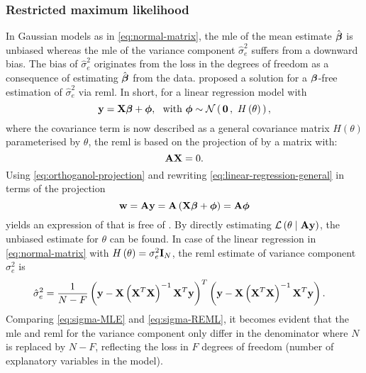 \subsubsection{Restricted maximum likelihood}
\label{subsubsection:REML}
In Gaussian models as in \cref{eq:normal-matrix}, the \gls{mle} of the mean estimate \(\hat{\boldsymbol{\mathbf{\beta}}}\) is unbiased whereas the \gls{mle} of the variance component \(\hat{\sigma}^2_e \) suffers from a downward bias. The bias of \(\hat{\sigma}^2_e \) originates from the loss in the degrees of freedom as a consequence of estimating \(\hat{\boldsymbol{\mathbf{\beta}}}\) from the data.  proposed a solution for a \(\boldsymbol{\mathbf{\beta}}\)-free estimation of \(\hat{\sigma}^2_e \) via \gls{reml}. In short, for a linear regression model with 
\begin{equation}
\boldsymbol{\mathbf{y}} = \boldsymbol{\mathbf{X}}\boldsymbol{\mathbf{\beta}} + \boldsymbol{\mathbf{\phi}}, \,\,\,\, \text{with }  \boldsymbol{\mathbf{\phi}} \sim  \mathcal{N}\left(\,{\boldsymbol{\mathbf{0}}}\,,~{H\left(\theta\right)}\,\right),
\label{eq:linear-regression-general}
\end{equation}
%
where the covariance term is now described as a general covariance matrix \(H\left(\theta\right)\) parameterised by \(\theta\), the \gls{reml} is based on the projection  of  by a matrix  with:
\begin{equation}
\label{eq:orthoganol-projection}
\boldsymbol{\mathbf{A}}\boldsymbol{\mathbf{X}}=0.
\end{equation}
%
Using \cref{eq:orthoganol-projection} and rewriting \cref{eq:linear-regression-general} in terms of the projection 
\begin{equation}
\boldsymbol{\mathbf{w}} = \boldsymbol{\mathbf{A}}\boldsymbol{\mathbf{y}} = \boldsymbol{\mathbf{A}}\left(\boldsymbol{\mathbf{X}}\boldsymbol{\mathbf{\beta}} + \boldsymbol{\mathbf{\phi}}\right) = \boldsymbol{\mathbf{A}}\boldsymbol{\mathbf{\phi}} 
\end{equation}
%
yields an expression of  that is free of \tmat{\beta}. By directly estimating \(\mathcal{L} \left(\theta \mid \boldsymbol{\mathbf{A}}\boldsymbol{\mathbf{y}}\right)\), the unbiased estimate for \(\theta\) can be found. In case of the linear regression in \cref{eq:normal-matrix} with \(H\left(\theta\right) = \sigma^2_e \boldsymbol{\mathbf{I}}_{N}\), the \gls{reml} estimate of variance component \(\sigma^2_e\) is
\begin{align}
\hat{\sigma}^2_e &= \frac{1}{N-F}\left(\boldsymbol{\mathbf{y}} -\boldsymbol{\mathbf{X}}\left(\boldsymbol{\mathbf{X}}^T\boldsymbol{\mathbf{X}}\right)^{-1}\boldsymbol{\mathbf{X}}^T\boldsymbol{\mathbf{y}}\right)^T\left(\boldsymbol{\mathbf{y}} -\boldsymbol{\mathbf{X}}\left(\boldsymbol{\mathbf{X}}^T\boldsymbol{\mathbf{X}}\right)^{-1}\boldsymbol{\mathbf{X}}^T\boldsymbol{\mathbf{y}}\right).
\label{eq:sigma-REML}
\end{align}
%
Comparing \cref{eq:sigma-MLE} and \cref{eq:sigma-REML}, it becomes evident that the \gls{mle} and \gls{reml} for the variance component only differ in the denominator where \(N\) is replaced by \(N-F\), reflecting the loss in \(F\) degrees of freedom (number of explanatory variables in the model). 

